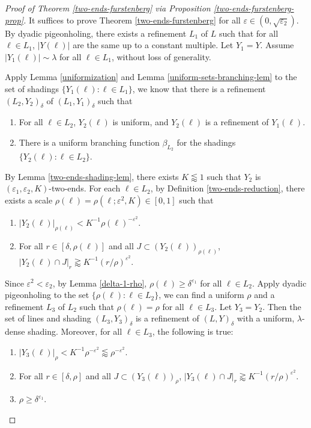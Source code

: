 \documentclass{amsart}
\numberwithin{equation}{section}
\newcommand{\be}{\beta}
\newcommand{\de}{\delta}
\newcommand{\e}{\varepsilon}
\newcommand{\la}{\lambda}
\begin{document}
\begin{proof}[Proof of Theorem \ref{two-ends-furstenberg} via Proposition \ref{two-ends-furstenberg-prop}]

It suffices to prove Theorem \ref{two-ends-furstenberg} for all $\e\in(0, \sqrt{\e_2})$.
By dyadic pigeonholing, there exists a refinement $L_1$ of $L$ such that for all $\ell\in L_1$, $|Y(\ell)|$ are the same up to a constant multiple. 
Let $Y_1=Y$.
Assume $|Y_1(\ell)|\sim\la$ for all $\ell\in L_1$, without loss of generality.


\smallskip

Apply Lemma \ref{uniformization} and Lemma \ref{uniform-sets-branching-lem} to the set of shadings $\{Y_1(\ell):\ell\in L_1\}$, we know that there is a refinement $(L_2,Y_2)_\de$ of $(L_1,Y_1)_\de$ such that 
\begin{enumerate}
    \item For all $\ell\in L_2$, $Y_2(\ell)$ is uniform, and $Y_2(\ell)$ is a refinement of $Y_1(\ell)$. 
    \item There is a uniform branching function $\be_{L_2}$ for the shadings $\{Y_2(\ell):\ell\in L_2\}$. 
\end{enumerate}
By Lemma \ref{two-ends-shading-lem}, there exists $K\lessapprox1$ such that $Y_2$ is $(\e_1, \e_2,K)$-two-ends.
For each $\ell\in L_2$, by Definition \ref{two-ends-reduction}, there exists a scale $\rho(\ell)=\rho(\ell;\e^2,K)\in[0,1]$ such that 
\begin{enumerate}
    \item $|Y_2(\ell)|_{\rho(\ell)}< K^{-1}\rho(\ell)^{-\e^2}$.
    \item For all $r\in[\de,\rho(\ell)]$ and all $J\subset (Y_2(\ell))_{\rho(\ell)}$, $|Y_2(\ell)\cap J|_r\gtrapprox K^{-1}(r/\rho)^{\e^2}$.
\end{enumerate}
Since $\e^2< \e_2$, by Lemma \ref{delta-1-rho}, $\rho(\ell)\geq\de^{\e_1}$ for all $\ell\in L_2$.
Apply dyadic pigeonholing to the set $\{\rho(\ell):\ell\in L_2\}$, we can find a uniform $\rho$ and a refinement $L_3$ of $L_2$ such that $\rho(\ell)=\rho$ for all $\ell\in L_3$.
Let $Y_3=Y_2$.
Then the set of lines and shading $(L_3,Y_3)_\de$ is a refinement of $(L,Y)_\de$ with a uniform, $\la$-dense shading.
Moreover, for all $\ell\in L_3$, the following is true:
\begin{enumerate}
    \item $|Y_3(\ell)|_\rho< K^{-1}\rho^{-\e^2} \lessapprox \rho^{-\e^2}$.
    \item For all $r\in[\de,\rho]$ and all $J\subset (Y_3(\ell))_{\rho}$, $|Y_3(\ell)\cap J|_r\gtrapprox K^{-1}(r/\rho)^{\e^2}$.
    \item $\rho\geq\de^{\e_1}$.
\end{enumerate}


\end{proof}
\end{document}
